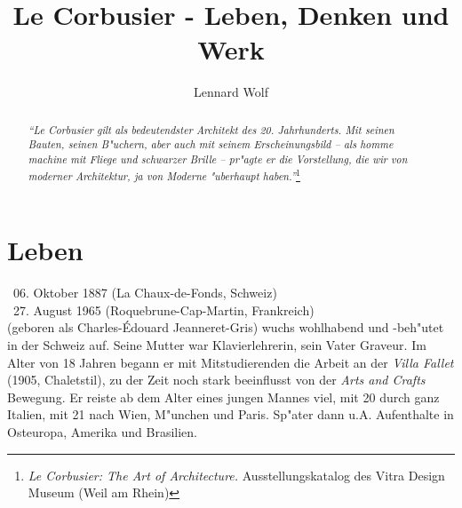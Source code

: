\documentclass[a4paper]{tufte-handout}
\title{Le Corbusier - Leben, Denken und Werk}%
\author[Lennard Wolf]{Lennard Wolf}
\date{ } %
\begin{document}
\maketitle%


\begin{abstract}
\noindent
\emph{"`Le Corbusier gilt als bedeutendster Architekt des 20. Jahrhunderts. Mit seinen Bauten, seinen B"uchern, aber auch mit seinem Erscheinungsbild -- als \emph{homme machine} mit Fliege und schwarzer Brille -- pr"agte er die Vorstellung, die wir von moderner Architektur, ja von Moderne "uberhaupt haben."'}\footnote{\emph{Le Corbusier: The Art of Architecture.} Ausstellungskatalog des Vitra Design Museum (Weil am Rhein)}
\end{abstract}


\section{Leben}\label{sec:leben}

\textasteriskcentered ~06. Oktober 1887 (La Chaux-de-Fonds, Schweiz)\\
\noindent \textdagger~27. August 1965 (Roquebrune-Cap-Martin, Frankreich)\\

 (geboren als Charles-\'Edouard Jeanneret-Gris) wuchs wohlhabend und -beh"utet in der Schweiz auf. Seine Mutter war Klavierlehrerin, sein Vater Graveur. Im Alter von 18 Jahren begann er mit Mitstudierenden die Arbeit an der \emph{Villa Fallet} (1905, Chaletstil), zu der Zeit noch stark beeinflusst von der \emph{Arts and Crafts} Bewegung. Er reiste ab dem Alter eines jungen Mannes viel, mit 20 durch ganz Italien, mit 21 nach Wien, M"unchen und Paris. Sp"ater dann u.A. Aufenthalte in Osteuropa, Amerika und Brasilien.
\end{document}
